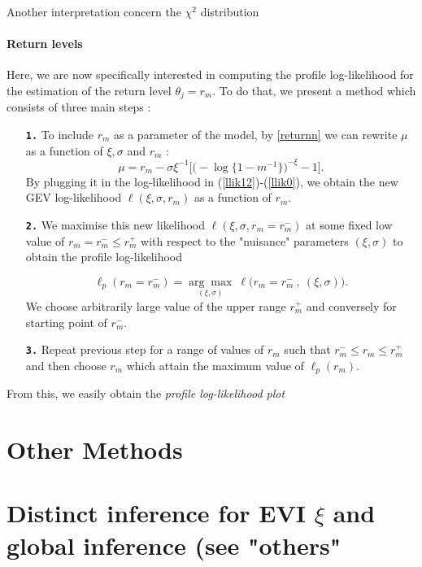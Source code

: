 \documentclass[11pt,a4paper,openany ]{book}
\begin{document}
Another interpretation concern the $\chi^2$ distribution

\paragraph{Return levels} Here, we are now specifically interested in computing the profile log-likelihood
for the estimation of the return level $\theta_j=r_m$. To do that, we present a method which consists of three main steps :

\begin{enumerate}[label=\textbf{\arabic*})]
	
	\item[\textbf{\texttt{1.}}]  To include $r_m$ as a parameter of the model, by \ref{returnn} we can rewrite $\mu$ as a function of $\xi,\sigma$ and $r_m$ :
	\begin{equation*}
	\mu= r_m-\sigma\xi^{-1}\Big[\Big(-\log\{1-m^{-1}\}\Big)^{-\xi}-1\Big].
	\end{equation*}
	By plugging it in the log-likelihood in (\ref{llik12})-(\ref{llik0}), we obtain the new GEV log-likelihood $\ell(\xi,\sigma,r_m)$ as a function of $r_m$.
	
	\item[\textbf{\texttt{2.}}]   We maximise this new likelihood $\ell (\xi,\sigma,r_m=r^{-}_{m})$ at some fixed low value of $r_m=r^{-}_{m}\leq r^{+}_{m}$ with respect to the "nuisance" parameters $(\xi,\sigma)$ to obtain the profile log-likelihood
	
	\begin{equation*}
	\ell_p(r_m=r^{-}_{m})=\underset{(\xi,\sigma)}{\mathrm{\arg\max}}\ \ell \Big(r_m=r^{-}_{m}\ ,\ (\xi,\sigma)\Big).
	\end{equation*} 
	We choose arbitrarily large value of the upper range $r^{+}_m$ and conversely for starting point of $r^{-}_m$.
	
	\item[\textbf{\texttt{3.}}]  Repeat previous step for a range of values of $r_m$ such that $r^{-}_{m}\leq r_m\leq r^{+}_{m}$ and then choose $r_m$ which attain the maximum value of $\ell_p(r_m)$.
\end{enumerate}

From this, we easily obtain the \emph{profile log-likelihood plot} 


\section{Other Methods}
\section*{Distinct inference for EVI $\xi$ and global inference (see "others"}
\citet[pp.140]{beirlant_statistics_2006}
\end{document}
